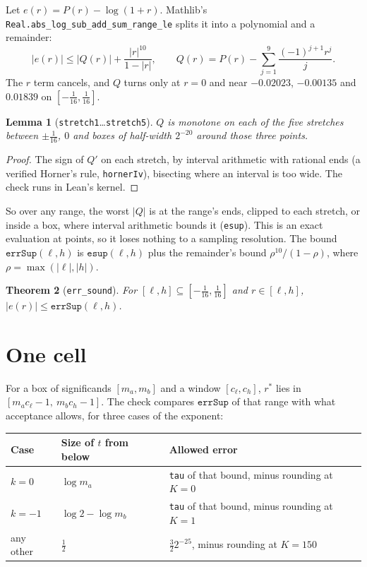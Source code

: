 \documentclass[11pt]{article}
\newtheorem{theorem}{Theorem}
\newtheorem{lemma}[theorem]{Lemma}
\newcommand{\lean}[1]{{\small\texttt{#1}}}
\begin{document}
Let $e(r) = P(r) - \log(1 + r)$. Mathlib's
\lean{Real.abs\_log\_sub\_add\_sum\_range\_le} splits it into a polynomial and a remainder:
\[
  |e(r)| \le |Q(r)| + \frac{|r|^{10}}{1 - |r|},
  \qquad Q(r) = P(r) - \sum_{j=1}^{9} \frac{(-1)^{j+1} r^j}{j}.
\]
The $r$ term cancels, and $Q$ turns only at $r = 0$ and near
$-0.02023$, $-0.00135$ and $0.01839$ on $[-\tfrac1{16}, \tfrac1{16}]$.

\begin{lemma}[\lean{stretch1}\ldots\lean{stretch5}]
$Q$ is monotone on each of the five stretches between $\pm\tfrac1{16}$, $0$ and boxes of
half-width $2^{-20}$ around those three points.
\end{lemma}

\begin{proof}
The sign of $Q'$ on each stretch, by interval arithmetic with rational ends (a verified
Horner's rule, \lean{hornerIv}), bisecting where an interval is too wide. The check runs
in Lean's kernel.
\end{proof}

So over any range, the worst $|Q|$ is at the range's ends, clipped to each stretch, or
inside a box, where interval arithmetic bounds it (\lean{esup}). This is an exact
evaluation at points, so it loses nothing to a sampling resolution. The bound
$\mathtt{errSup}(\ell,h)$ is $\mathtt{esup}(\ell,h)$ plus the remainder's bound
$\rho^{10}/(1-\rho)$, where $\rho = \max(|\ell|, |h|)$.

\begin{theorem}[\lean{err\_sound}]
For $[\ell, h] \subseteq [-\tfrac1{16}, \tfrac1{16}]$ and $r \in [\ell, h]$,
$|e(r)| \le \mathtt{errSup}(\ell, h)$.
\end{theorem}

\section{One cell}\label{sec:cell}

For a box of significands $[m_a, m_b]$ and a window $[c_\ell, c_h]$, $r^*$ lies in
$[m_a c_\ell - 1,\ m_b c_h - 1]$. The check compares $\mathtt{errSup}$ of that range with
what acceptance allows, for three cases of the exponent:

\begin{center}
\begin{tabular}{lll}
\toprule
Case & Size of $t$ from below & Allowed error \\
\midrule
$k = 0$ & $\log m_a$ & \lean{tau} of that bound, minus rounding at $K = 0$ \\
$k = -1$ & $\log 2 - \log m_b$ & \lean{tau} of that bound, minus rounding at $K = 1$ \\
any other & $\tfrac12$ & $\tfrac32 2^{-25}$, minus rounding at $K = 150$ \\
\bottomrule
\end{tabular}
\end{center}
\end{document}
